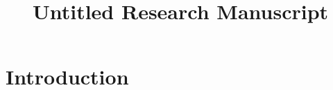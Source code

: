 \documentclass{article}
\title{Untitled Research Manuscript}
\author{}
\date{}
\begin{document}
\maketitle
\begin{abstract}
\end{abstract}
\section{Introduction}
\end{document}
